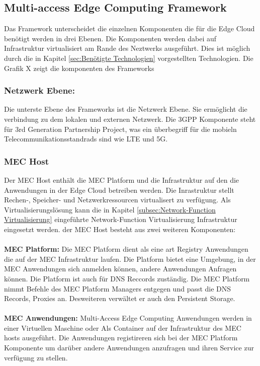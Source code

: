 \documentclass[runningheads]{llncs}
\numberwithin{figure}{section}
\begin{document}
\subsection{Multi-access Edge Computing Framework}
Das Framework unterscheidet die einzelnen Komponenten die für die Edge Cloud benötigt werden in drei Ebenen. 
Die Komponenten werden dabei auf Infrastruktur virtualisiert am Rande des Neztwerks ausgeführt. 
Dies ist möglich durch die in Kapitel \ref{sec:Benötigte Technologien} vorgestellten Technologien.
Die Grafik X zeigt die komponenten des Frameworks

\subsubsection{Netzwerk Ebene:}
Die unterste Ebene des Frameworks ist die Netzwerk Ebene. Sie ermöglicht die verbindung zu dem lokalen und 
externen Netzwerk.  Die 3GPP Komponente steht für 3rd Generation Partnership Project, was ein überbegriff für die mobieln
Telecommunikationsstandrads sind wie LTE und 5G. 
\subsubsection{MEC Host}
Der MEC Host enthält die MEC Platform und die Infrastruktur auf den die Anwendungen in der Edge Cloud betreiben werden.
Die Inrastruktur stellt Rechen-, Speicher- und Netzwerkressourcen  virtualisert zu verfügung. Als Virtualisierungslösung kann
die in Kapitel \ref{subsec:Network-Function Virtualisierung} eingeführte Network-Function Virtualisierung Infrastruktur
eingesetzt werden. der MEC Host besteht aus zwei weiteren Komponenten:
\\
\\
\textbf{MEC Platform:} Die MEC Platform dient als eine art Registry 
Anwendungen die auf der MEC Infrastruktur laufen. Die Platform bietet eine Umgebung, in der MEC Anwendungen sich anmelden können,
andere Anwendungen Anfragen können. Die Platform ist auch für DNS Reccords zuständig. Die MEC Platform nimmt Befehle
des MEC Platform Managers entgegen und passt die DNS Records, Proxies an. Desweiteren verwältet er auch den Persistent Storage.
\\
\\
\textbf{MEC Anwendungen:} Multi-Access Edge Computing Anwendungen werden in einer Virtuellen Maschine oder Als
Container auf der Infrastruktur des MEC hosts ausgeführt. Die Anwendungen registireren sich bei der MEC Platform
Komponente um darüber andere Anwendungen anzufragen und ihren Service zur verfügung zu stellen.
\end{document}
